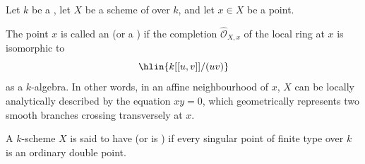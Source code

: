 \begin{definition} \label{definition:ordinary_double_point_of_a_finite_type_scheme_over_a_field}
    Let $k$ be a , let $X$ be a scheme of  over $k$, and let $x \in X$ be a point. 

    The point $x$ is called an  (or a ) if the completion $\widehat{\mathcal{O}}_{X,x}$ of the local ring at $x$ is isomorphic to
    $$\hlin{k[[u, v]]/(uv)}$$
    as a $k$-algebra. In other words, in an affine neighbourhood of $x$, $X$ can be locally analytically described by the equation $xy = 0$, which geometrically represents two smooth branches crossing transversely at $x$.

    A $k$-scheme $X$ is said to have  (or is ) if every singular point of finite type over $k$ is an ordinary double point.
\end{definition}
